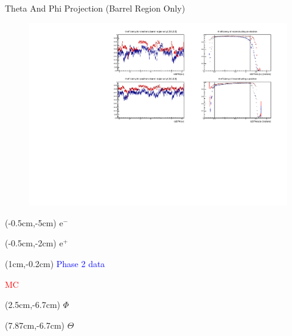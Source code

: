 \documentclass[10pt]{beamer}
\begin{document}
\begin{frame}{Theta And Phi Projection (Barrel Region Only)}
	\begin{figure}
		\centering
		\includegraphics[width=\textwidth]{Plots/Eff/PhiBarrel1.pdf}
	\end{figure}
	
	
	\begin{textblock*}{0.3\textwidth}(-0.5cm,-5cm)
		$\textrm{e}^-$
	\end{textblock*}
	\begin{textblock*}{0.3\textwidth}(-0.5cm,-2cm)
		$\textrm{e}^+$
	\end{textblock*}
	
	
	\begin{textblock*}{0.5\textwidth}(1cm,-0.2cm)
		\textcolor{blue}{Phase 2 data}
		
		\textcolor{red}{MC}
		
		
	\end{textblock*}
	
	\begin{textblock*}{0.3\textwidth}(2.5cm,-6.7cm)
		$\Phi$
	\end{textblock*}
	
	
	\begin{textblock*}{0.3\textwidth}(7.87cm,-6.7cm)
		$\Theta$
	\end{textblock*}
	
	
	
\end{frame}
\end{document}
